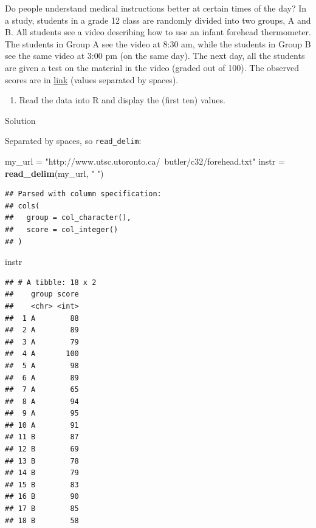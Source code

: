 \documentclass[]{tufte-book}
\newenvironment{Shaded}{}{}
\newcommand{\KeywordTok}[1]{\textcolor[rgb]{0.00,0.44,0.13}{\textbf{#1}}}
\newcommand{\NormalTok}[1]{#1}
\newcommand{\StringTok}[1]{\textcolor[rgb]{0.25,0.44,0.63}{#1}}
\providecommand{\tightlist}{%
  \setlength{\itemsep}{0pt}\setlength{\parskip}{0pt}}
\theoremstyle{definition}
\theoremstyle{definition}
\theoremstyle{definition}
\theoremstyle{remark}
\begin{document}
Do people understand medical instructions better at certain times of the
day? In a study, students in a grade 12 class are randomly divided into
two groups, A and B. All students see a video describing how to use an
infant forehead thermometer. The students in Group A see the video at
8:30 am, while the students in Group B see the same video at 3:00 pm (on
the same day). The next day, all the students are given a test on the
material in the video (graded out of 100). The observed scores are in
\href{http://www.utsc.utoronto.ca/~butler/c32/forehead.txt}{link}
(values separated by spaces).

\begin{enumerate}
\def\labelenumi{(\alph{enumi})}
\tightlist
\item
  Read the data into R and display the (first ten) values.
\end{enumerate}

Solution

Separated by spaces, so \texttt{read\_delim}:

\begin{Shaded}
\begin{Highlighting}[]
\NormalTok{my_url =}\StringTok{ "http://www.utsc.utoronto.ca/~butler/c32/forehead.txt"}
\NormalTok{instr =}\StringTok{ }\KeywordTok{read_delim}\NormalTok{(my_url, }\StringTok{" "}\NormalTok{)}
\end{Highlighting}
\end{Shaded}

\begin{verbatim}
## Parsed with column specification:
## cols(
##   group = col_character(),
##   score = col_integer()
## )
\end{verbatim}

\begin{Shaded}
\begin{Highlighting}[]
\NormalTok{instr}
\end{Highlighting}
\end{Shaded}

\begin{verbatim}
## # A tibble: 18 x 2
##    group score
##    <chr> <int>
##  1 A        88
##  2 A        89
##  3 A        79
##  4 A       100
##  5 A        98
##  6 A        89
##  7 A        65
##  8 A        94
##  9 A        95
## 10 A        91
## 11 B        87
## 12 B        69
## 13 B        78
## 14 B        79
## 15 B        83
## 16 B        90
## 17 B        85
## 18 B        58
\end{verbatim}
\end{document}
